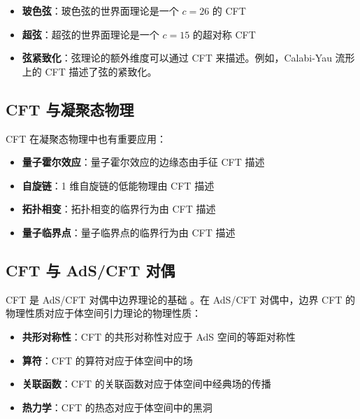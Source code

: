 \begin{example}
\begin{itemize}
    \item \textbf{玻色弦}：玻色弦的世界面理论是一个 $c = 26$ 的 CFT
    \item \textbf{超弦}：超弦的世界面理论是一个 $c = 15$ 的超对称 CFT \cite{Green1987}
    \item \textbf{弦紧致化}：弦理论的额外维度可以通过 CFT 来描述。例如，Calabi-Yau 流形上的 CFT 描述了弦的紧致化。
\end{itemize}
\end{example}

\subsection{CFT 与凝聚态物理}

\begin{example}
CFT 在凝聚态物理中也有重要应用：
\begin{itemize}
    \item \textbf{量子霍尔效应}：量子霍尔效应的边缘态由手征 CFT 描述
    \item \textbf{自旋链}：1 维自旋链的低能物理由 CFT 描述
    \item \textbf{拓扑相变}：拓扑相变的临界行为由 CFT 描述
    \item \textbf{量子临界点}：量子临界点的临界行为由 CFT 描述
\end{itemize}
\end{example}

\subsection{CFT 与 AdS/CFT 对偶}

\begin{note}
CFT 是 AdS/CFT 对偶中边界理论的基础 \cite{Maldacena1997, Witten1998}。在 AdS/CFT 对偶中，边界 CFT 的物理性质对应于体空间引力理论的物理性质：
\begin{itemize}
    \item \textbf{共形对称性}：CFT 的共形对称性对应于 AdS 空间的等距对称性
    \item \textbf{算符}：CFT 的算符对应于体空间中的场
    \item \textbf{关联函数}：CFT 的关联函数对应于体空间中经典场的传播
    \item \textbf{热力学}：CFT 的热态对应于体空间中的黑洞 \cite{Witten1998b}
\end{itemize}
\end{note}

